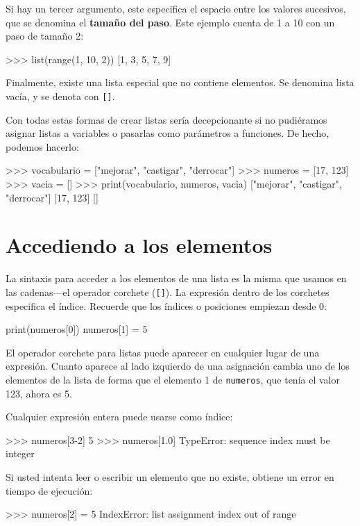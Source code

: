 Si hay un tercer argumento, este especifica el espacio entre los valores
sucesivos, que se denomina el \textbf{tamaño del paso}. Este ejemplo
cuenta de 1 a 10 con un paso de tamaño 2:
\begin{pyconcode}
>>> list(range(1, 10, 2))
[1, 3, 5, 7, 9]
\end{pyconcode}

Finalmente, existe una lista especial que no contiene elementos. Se
denomina lista vacía, y se denota con \texttt{{[}{]}}.

Con todas estas formas de crear listas sería decepcionante si no pudiéramos
asignar listas a variables o pasarlas como parámetros a funciones.
De hecho, podemos hacerlo:
\begin{pyconcode}
>>> vocabulario = ["mejorar", "castigar", "derrocar"]
>>> numeros = [17, 123]
>>> vacia = []
>>> print(vocabulario, numeros, vacia)
["mejorar", "castigar", "derrocar"] [17, 123] []
\end{pyconcode}

\section{Accediendo a los elementos}

 

La sintaxis para acceder a los elementos de una lista es la misma
que usamos en las cadenas—el operador corchete (\texttt{{[}{]}}).
La expresión dentro de los corchetes especifica el índice. Recuerde
que los índices o posiciones empiezan desde 0:
\begin{pythoncode}
print(numeros[0])
numeros[1] = 5
\end{pythoncode}

El operador corchete para listas puede aparecer en cualquier lugar
de una expresión. Cuanto aparece al lado izquierdo de una asignación
cambia uno de los elementos de la lista de forma que el elemento 1
de \texttt{numeros}, que tenía el valor 123, ahora es 5.

Cualquier expresión entera puede usarse como índice:
\begin{pyconcode}
>>> numeros[3-2]
5
>>> numeros[1.0]
TypeError: sequence index must be integer
\end{pyconcode}

Si usted intenta leer o escribir un elemento que no existe, obtiene
un error en tiempo de ejecución:

\begin{pyconcode}
>>> numeros[2] = 5
IndexError: list assignment index out of range
\end{pyconcode}

